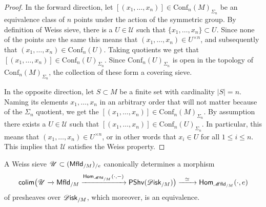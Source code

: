 \documentclass[../text.tex]{subfiles}
\begin{document}
\begin{proof}
    In the forward direction, let $[(x_1, \dots, x_n)] \in \mathrm{Conf}_n(M)_{\Sigma_n}$ be an equivalence class of $n$ points under the action of the symmetric group. By definition of Weiss sieve, there is a $U \in \mathscr{U}$ such that $\{x_1, \dots, x_n\} \subset U$. Since none of the points are the same this means that $(x_1, \dots, x_n) \in U^{\times n}$, and subsequently that $(x_1, \dots, x_n) \in \mathrm{Conf}_n(U)$. Taking quotients we get that $[(x_1, \dots, x_n)] \in \mathrm{Conf}_n(U)_{\Sigma_n}$. Since $\mathrm{Conf}_n(U)_{\Sigma_n}$ is open in the topology of $\mathrm{Conf}_n(M)_{\Sigma_n}$, the collection of these form a covering sieve.

    In the opposite direction, let $S \subset M$ be a finite set with cardinality $|S| = n$. Naming its elements $x_1, \dots, x_n$ in an arbitrary order that will not matter because of the $\Sigma_n$ quotient, we get the $[(x_1, \dots, x_n)] \in \mathrm{Conf}_n(M)_{\Sigma_n}$. By assumption there exists a $U \in \mathscr{U}$ such that $[(x_1, \dots, x_n)] \in \mathrm{Conf}_n(U)_{\Sigma_n}$. In particular, this means that $(x_1, \dots, x_n) \in U^{\times n}$, or in other words that $x_i \in U$ for all $1 \leq i \leq n$. This implies that $\mathscr{U}$ satisfies the Weiss property.
\end{proof}



\begin{lemma}\label{lem:gluing_disk/M/e}
    A Weiss sieve $\mathscr{U} \subset (\mfld[r]_{/M})_{/e}$ canonically determines a morphism
    \begin{equation}
        \mathsf{colim} \big( \mathscr{U} \xrightarrow{} \mfld[r]_{/M} \xrightarrow{\mathsf{Hom}_{\mfld_{/M}}(\cdot, -)} \mathsf{PShv}(\disk_{/M}) \big) \xrightarrow{\ \ \simeq \ \ } \mathsf{Hom}_{\mfld_{/M}}(\cdot, e)
    \end{equation}
    of presheaves over $\disk_{/M}$, which moreover, is an equivalence.
\end{lemma}
\end{document}

